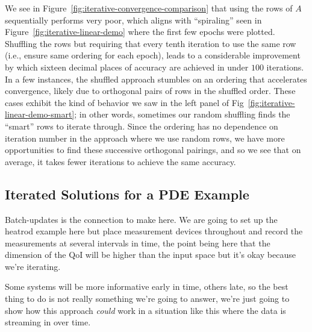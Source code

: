 We see in Figure~\ref{fig:iterative-convergence-comparison} that using the rows of $A$ sequentially performs very poor, which aligns with ``spiraling'' seen in Figure~\ref{fig:iterative-linear-demo} where the first few epochs were plotted.
Shuffling the rows but requiring that every tenth iteration to use the same row (i.e., ensure same ordering for each epoch), leads to a considerable improvement by which sixteen decimal places of accuracy are achieved in under $100$ iterations.
In a few instances, the shuffled approach stumbles on an ordering that accelerates convergence, likely due to orthogonal pairs of rows in the shuffled order.
These cases exhibit the kind of behavior we saw in the left panel of Fig~\ref{fig:iterative-linear-demo-smart}; in other words, sometimes our random shuffling finds the ``smart'' rows to iterate through.
Since the ordering has no dependence on iteration number in the approach where we use random rows, we have more opportunities to find these successive orthogonal pairings, and so we see that on average, it takes fewer iterations to achieve the same accuracy.


\subsection{Iterated Solutions for a PDE Example}\label{sec:iterated-nonlinear}

Batch-updates is the connection to make here.
We are going to set up the heatrod example here but place measurement devices throughout and record the measurements at several intervals in time, the point being here that the dimension of the QoI will be higher than the input space but it's okay because we're iterating.

Some systems will be more informative early in time, others late, so the best thing to do is not really something we're going to answer, we're just going to show how this approach \emph{could} work in a situation like this where the data is streaming in over time.

